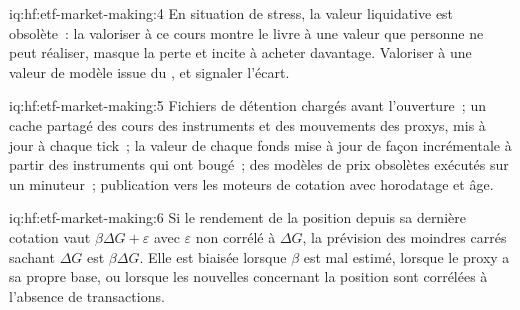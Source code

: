 \begin{solution}{iq:hf:etf-market-making:4}
En situation de stress, la valeur liquidative est obsolète~: la valoriser à ce cours montre le livre à une valeur que personne ne peut réaliser, masque la perte
et incite à acheter davantage. Valoriser à une valeur de modèle issue du , et signaler l'écart.
\end{solution}

\begin{solution}{iq:hf:etf-market-making:5}
Fichiers de détention chargés avant l'ouverture~; un cache partagé des cours des instruments et des mouvements des proxys, mis à jour à chaque tick~; la valeur
de chaque fonds mise à jour de façon incrémentale à partir des instruments qui ont bougé~; des modèles de prix obsolètes exécutés sur un minuteur~; publication vers les moteurs de cotation avec horodatage et âge.
\end{solution}

\begin{solution}{iq:hf:etf-market-making:6}
Si le rendement de la position depuis sa dernière cotation vaut $\beta\Delta G+\varepsilon$ avec $\varepsilon$ non corrélé à $\Delta G$, la prévision des
moindres carrés sachant $\Delta G$ est $\beta\Delta G$. Elle est biaisée lorsque $\beta$ est mal estimé, lorsque le proxy a sa propre base, ou lorsque les
nouvelles concernant la position sont corrélées à l'absence de transactions.
\end{solution}
